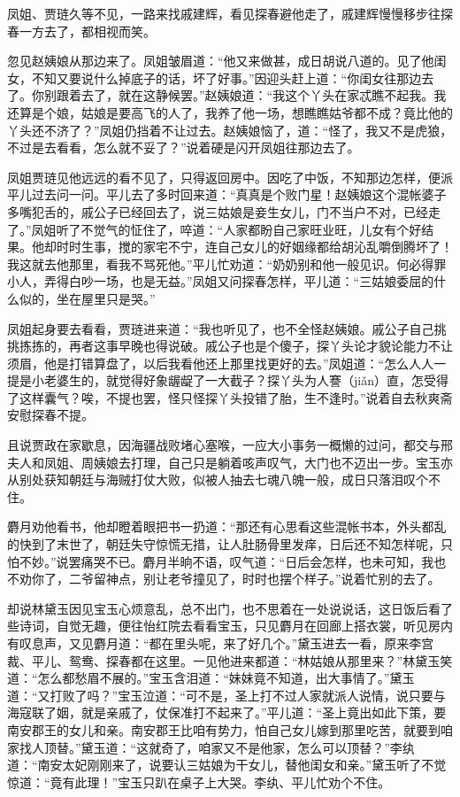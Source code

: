 \documentclass[12pt,oneside]{book}
\begin{document}
凤姐、贾琏久等不见，一路来找戚建辉，看见探春避他走了，戚建辉慢慢移步往探春一方去了，都相视而笑。

忽见赵姨娘从那边来了。凤姐皱眉道：“他又来做甚，成日胡说八道的。见了他闺女，不知又要说什么掉底子的话，坏了好事。”因迎头赶上道：“你闺女往那边去了。你别跟着去了，就在这静候罢。”赵姨娘道：“我这个丫头在家忒瞧不起我。我还算是个娘，姑娘是要高飞的人了，我养了他一场，想瞧瞧姑爷都不成？竟比他的丫头还不济了？”凤姐仍挡着不让过去。赵姨娘恼了，道：“怪了，我又不是虎狼，不过是去看看，怎么就不妥了？”说着硬是闪开凤姐往那边去了。

凤姐贾琏见他远远的看不见了，只得返回房中。因吃了中饭，不知那边怎样，便派平儿过去问一问。平儿去了多时回来道：“真真是个败门星！赵姨娘这个混帐婆子多嘴犯舌的，戚公子已经回去了，说三姑娘是妾生女儿，门不当户不对，已经走了。”凤姐听了不觉气的怔住了，啐道：“人家都盼自己家旺业旺，儿女有个好结果。他却时时生事，搅的家宅不宁，连自己女儿的好姻缘都给胡沁乱嚼倒腾坏了！我这就去他那里，看我不骂死他。”平儿忙劝道：“奶奶别和他一般见识。何必得罪小人，弄得白吵一场，也是无益。”凤姐又问探春怎样，平儿道：“三姑娘委屈的什么似的，坐在屋里只是哭。”

凤姐起身要去看看，贾琏进来道：“我也听见了，也不全怪赵姨娘。戚公子自己挑挑拣拣的，再者这事早晚也得说破。戚公子也是个傻子，探丫头论才貌论能力不让须眉，他是打错算盘了，以后我看他还上那里找更好的去。”凤姐道：“怎么人人一提是小老婆生的，就觉得好象龌龊了一大截子？探丫头为人謇（jiǎn）直，怎受得了这样囊气？唉，不提也罢，怪只怪探丫头投错了胎，生不逢时。”说着自去秋爽斋安慰探春不提。

且说贾政在家歇息，因海疆战败堵心塞喉，一应大小事务一概懒的过问，都交与邢夫人和凤姐、周姨娘去打理，自己只是躺着咳声叹气，大门也不迈出一步。宝玉亦从别处获知朝廷与海贼打仗大败，似被人抽去七魂八魄一般，成日只落泪叹个不住。

麝月劝他看书，他却瞪着眼把书一扔道：“那还有心思看这些混帐书本，外头都乱的快到了末世了，朝廷失守惊慌无措，让人肚肠骨里发痒，日后还不知怎样呢，只怕不妙。”说罢痛哭不已。麝月半晌不语，叹气道：“日后会怎样，也未可知，我也不劝你了，二爷留神点，别让老爷撞见了，时时也摆个样子。”说着忙别的去了。

却说林黛玉因见宝玉心烦意乱，总不出门，也不思着在一处说说话，这日饭后看了些诗词，自觉无趣，便往怡红院去看看宝玉，只见麝月在回廊上搭衣裳，听见房内有叹息声，又见麝月道：“都在里头呢，来了好几个。”黛玉进去一看，原来李宫裁、平儿、鸳鸯、探春都在这里。一见他进来都道：“林姑娘从那里来？”林黛玉笑道：“怎么都愁眉不展的。”宝玉含泪道：“妹妹竟不知道，出大事情了。”黛玉道：“又打败了吗？”宝玉泣道：“可不是，圣上打不过人家就派人说情，说只要与海寇联了姻，就是亲戚了，仗保准打不起来了。”平儿道：“圣上竟出如此下策，要南安郡王的女儿和亲。南安郡王比咱有势力，怕自己女儿嫁到那里吃苦，就要到咱家找人顶替。”黛玉道：“这就奇了，咱家又不是他家，怎么可以顶替？”李纨道：“南安太妃刚刚来了，说要认三姑娘为干女儿，替他闺女和亲。”黛玉听了不觉惊道：“竟有此理！”宝玉只趴在桌子上大哭。李纨、平儿忙劝个不住。
\end{document}

